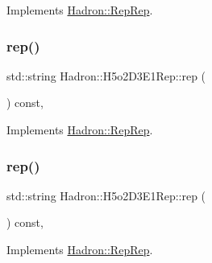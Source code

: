 Implements \mbox{\hyperlink{structHadron_1_1RepRep_ab3213025f6de249f7095892109575fde}{Hadron\+::\+Rep\+Rep}}.

\mbox{\label{structHadron_1_1H5o2D3E1Rep_a08df80842b4ad843fc04e24eb3febd57}} 
\subsubsection{\texorpdfstring{rep()}{rep()}\hspace{0.1cm}{\footnotesize\ttfamily [2/5]}}
{\footnotesize\ttfamily std\+::string Hadron\+::\+H5o2\+D3\+E1\+Rep\+::rep (\begin{DoxyParamCaption}{ }\end{DoxyParamCaption}) const\hspace{0.3cm}{\ttfamily [inline]}, {\ttfamily [virtual]}}



Implements \mbox{\hyperlink{structHadron_1_1RepRep_ab3213025f6de249f7095892109575fde}{Hadron\+::\+Rep\+Rep}}.

\mbox{\label{structHadron_1_1H5o2D3E1Rep_a08df80842b4ad843fc04e24eb3febd57}} 
\subsubsection{\texorpdfstring{rep()}{rep()}\hspace{0.1cm}{\footnotesize\ttfamily [3/5]}}
{\footnotesize\ttfamily std\+::string Hadron\+::\+H5o2\+D3\+E1\+Rep\+::rep (\begin{DoxyParamCaption}{ }\end{DoxyParamCaption}) const\hspace{0.3cm}{\ttfamily [inline]}, {\ttfamily [virtual]}}



Implements \mbox{\hyperlink{structHadron_1_1RepRep_ab3213025f6de249f7095892109575fde}{Hadron\+::\+Rep\+Rep}}.

\mbox{\label{structHadron_1_1H5o2D3E1Rep_a08df80842b4ad843fc04e24eb3febd57}} 

